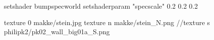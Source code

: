 setshader bumpspecworld
setshaderparam "specscale" 0.2 0.2 0.2

texture 0 makke/stein.jpg
texture n makke/stein_N.png
//texture s philipk2/pk02_wall_big01a_S.png
